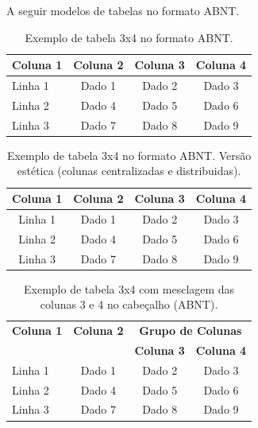 A seguir modelos de tabelas no formato ABNT.

\begin{table}[H]
\centering
\caption{Exemplo de tabela 3x4 no formato ABNT.}\label{tab:abnt}
\begin{tabular}{lccc}
\toprule
\textbf{Coluna 1} & \textbf{Coluna 2} & \textbf{Coluna 3} & \textbf{Coluna 4} \\
\midrule
Linha 1 & Dado 1 & Dado 2 & Dado 3 \\
Linha 2 & Dado 4 & Dado 5 & Dado 6 \\
Linha 3 & Dado 7 & Dado 8 & Dado 9 \\
\bottomrule
\end{tabular}
\end{table}


\begin{table}[H]
\centering
\caption{Exemplo de tabela 3x4 no formato ABNT. Versão estética (colunas centralizadas e distribuidas).}\label{tab:abnt_ex}
\begin{tabularx}{\linewidth}{CCCC}
\toprule
\textbf{Coluna 1} & \textbf{Coluna 2} & \textbf{Coluna 3} & \textbf{Coluna 4} \\
\midrule
Linha 1 & Dado 1 & Dado 2 & Dado 3 \\
Linha 2 & Dado 4 & Dado 5 & Dado 6 \\
Linha 3 & Dado 7 & Dado 8 & Dado 9 \\
\bottomrule
\end{tabularx}
\end{table}


\begin{table}[H]
\centering
\caption{Exemplo de tabela 3x4 com mesclagem das colunas 3 e 4 no cabeçalho (ABNT).}\label{tab:abnt_mescla_colunas}
\begin{tabular}{lccc}
\toprule
\textbf{Coluna 1} & \textbf{Coluna 2} &  \multicolumn{2}{c}{\textbf{Grupo de Colunas}} \\
\cmidrule(lr){3-4}
 & &  \textbf{Coluna 3} & \textbf{Coluna 4} \\
\midrule
Linha 1 & Dado 1 & Dado 2 & Dado 3\\
Linha 2 & Dado 4 & Dado 5 & Dado 6\\
Linha 3 & Dado 7 & Dado 8 & Dado 9\\
\bottomrule
\end{tabular}
\end{table}


